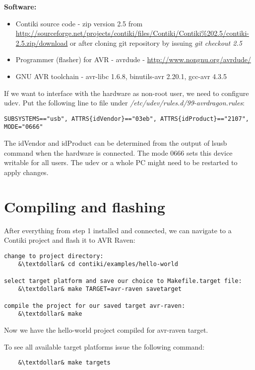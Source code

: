 \documentclass{article}
\begin{document}

\vspace{0.5cm}

{\textbf{Software:}}
\begin{itemize}
	\item Contiki source code - zip version 2.5 from\\
	\url{http://sourceforge.net/projects/contiki/files/Contiki/Contiki%202.5/contiki-2.5.zip/download}
	or after cloning git repository by issuing {\it{git checkout 2.5}}
	\item Programmer (flasher) for AVR - avrdude - \url{http://www.nongnu.org/avrdude/}
	\item GNU AVR toolchain - avr-libc 1.6.8, binutils-avr 2.20.1, gcc-avr 4.3.5 %
\end{itemize}

If we want to interface with the hardware as non-root user, we need to configure udev.
Put the following line to file under {\it{/etc/udev/rules.d/99-avrdragon.rules}}:
\begin{lstlisting}
SUBSYSTEMS=="usb", ATTRS{idVendor}=="03eb", ATTRS{idProduct}=="2107", MODE="0666"
\end{lstlisting}
The idVendor and idProduct can be determined from the output of lsusb command when the hardware is connected.
The mode 0666 sets this device writable for all users.
The udev or a whole PC might need to be restarted to apply changes.


\section{Compiling and flashing}
After everything from step 1 installed and connected, we can navigate to a Contiki project and flash it to AVR Raven:
\begin{lstlisting}
change to project directory:
	&\textdollar& cd contiki/examples/hello-world

select target platform and save our choice to Makefile.target file:
	&\textdollar& make TARGET=avr-raven savetarget

compile the project for our saved target avr-raven:
	&\textdollar& make
\end{lstlisting}
Now we have the hello-world project compiled for avr-raven target.

To see all available target platforms issue the following command:
\begin{lstlisting}
	&\textdollar& make targets
\end{lstlisting}
\end{document}

